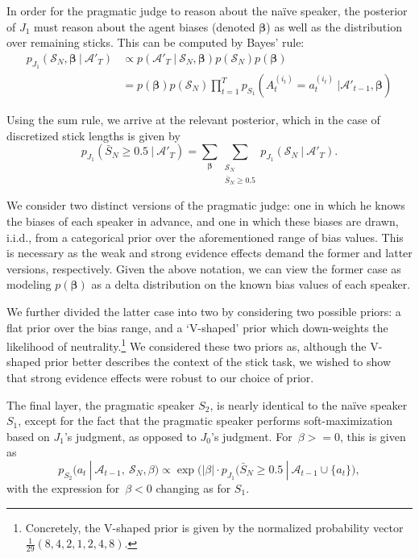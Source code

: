\documentclass[10pt,letterpaper]{article}
\begin{document}
In order for the pragmatic judge to reason about the na\"ive speaker, the posterior of $J_1$ must reason about the agent
biases (denoted $\bm{\beta}$) as well as the distribution over remaining sticks. This can be computed by Bayes' rule:
\begin{align*}
	p_{J_1} (\mathcal{S}_N, \bm{\beta} \ | \ \mathcal{A}'_T) &\propto p(\mathcal{A}'_T \ | \ \mathcal{S}_N, \bm{\beta}) p(\mathcal{S}_N) p(\bm{\beta}) \\
	&= p(\bm{\beta}) p(\mathcal{S}_N) \prod_{t=1}^T p_{S_1}(A_t^{(i_t)}=a_t^{(i_t)} \ |  \mathcal{A}'_{t-1}, \bm{\beta})
\end{align*}

Using the sum rule, we arrive at the relevant posterior, which in the case of discretized stick lengths is given by
\begin{equation}
	p_{J_1} ( \bar{S}_N \ge 0.5 \ | \ \mathcal{A}'_T ) = \sum_{\bm{\beta}} \sum_{\substack{\mathcal{S}_N \\ \bar{S}_N \ge 0.5}} p_{J_1} (\mathcal{S}_N \ | \ \mathcal{A}'_T).
\end{equation}

We consider two distinct versions of the pragmatic judge: one in which he knows the biases of each speaker in advance, and
one in which these biases are drawn, i.i.d., from a categorical prior over the aforementioned range of bias values. This is 
necessary as the weak and strong evidence effects demand the former and latter versions, respectively. Given the above notation,
we can view the former case as modeling $p(\bm{\beta})$ as a delta distribution on the known bias values of each speaker.

We further divided the latter case into two by considering two possible priors: a flat prior over the bias range, and a `V-shaped' prior which down-weights 
the likelihood of neutrality.\footnote{Concretely, the V-shaped prior is given by the normalized probability vector $\frac{1}{29} (8, 4, 2, 1, 2, 4, 8)$.} 
We considered these two priors as, although the V-shaped prior better describes the context of the stick task, we wished to show 
that strong evidence effects were robust to our choice of prior.

The final layer, the pragmatic speaker $S_2$, is nearly identical to the na\"ive speaker $S_1$, except for the fact that
the pragmatic speaker performs soft-maximization based on $J_1$'s judgment, as opposed to $J_0$'s judgment. For~${\beta>=0}$,
this is given as
\begin{equation}
	p_{S_2} (a_t \ | \ \mathcal{A}_{t-1},\ \mathcal{S}_N, \beta) \propto \exp \bigl(\lvert\beta\rvert  \cdot p_{J_1} (\bar{S}_N \ge 0.5 \ | \ \mathcal{A}_{t-1} \cup \{a_t\} \bigr),
\end{equation}
with the expression for~${\beta<0}$ changing as for $S_1$.
\end{document}
